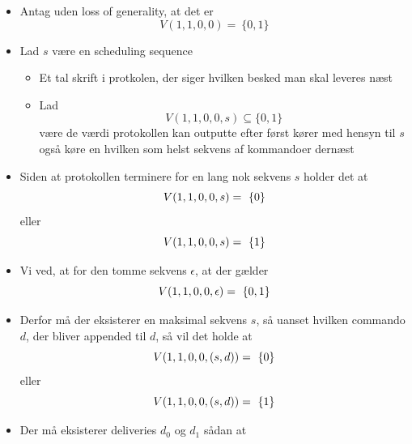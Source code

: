 \documentclass[a4, english]{article}
\begin{document}
\begin{itemize}
  \begin{itemize}
  	\item Antag uden loss of generality, at det er 
    \begin{equation*} 
      V(1,1,0,0) = \ \{0,1\} 
    \end{equation*}
    \item Lad $s$ være en scheduling sequence  
    \begin{itemize}
    	\item Et tal skrift i protkolen, der siger hvilken besked man skal leveres næst 
      \item Lad
      \begin{equation*} 
        V(1,1,0,0, s) \subseteq \{0,1\} 
      \end{equation*}
      være de værdi protokollen kan outputte efter først kører med hensyn til $s$ også køre en hvilken som helst sekvens af kommandoer dernæst 
    \end{itemize}
    \item Siden at protokollen terminere for en lang nok sekvens $s$ holder det at 
    \begin{equation*}
      V(1,1,0,0, s) = \ \{0\} \\
    \end{equation*}
    eller 
    \begin{equation*}
      V(1,1,0,0, s) = \ \{1\} \\
    \end{equation*}
    \item Vi ved, at for den tomme sekvens $\epsilon$, at der gælder
    \begin{equation*}
      V(1,1,0,0, \epsilon) = \ \{0, 1\} \\
    \end{equation*}
    \item Derfor må der eksisterer en maksimal sekvens $s$, så uanset hvilken commando $d$, der bliver appended til $d$, så vil det holde at 
    \begin{equation*}
      V(1,1,0,0, (s,d)) = \ \{0\} \\
    \end{equation*}
    eller 
    \begin{equation*}
      V(1,1,0,0, (s,d)) = \ \{1\} \\
    \end{equation*}
    \item Der må eksisterer deliveries $d_0$ og $d_1$ sådan at   
    \begin{equation*}

\end{equation*}
\end{itemize}
\end{itemize}
\end{document}
